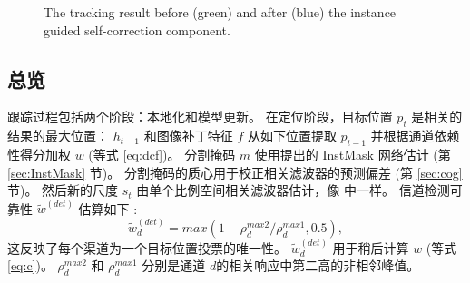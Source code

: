 \begin{figure}
                       \hspace{-0.6em}
                       \hspace{-0.6em}
    \caption{The tracking result before (green) and after (blue) the instance guided self-correction component.}
    \label{fig:IGSC}
\end{figure}

\subsection{总览}
跟踪过程包括两个阶段：本地化和模型更新。
在定位阶段，目标位置 $p_t$ 是相关的结果的最大位置： $h_{t-1}$ 和图像补丁特征 $f$ 从如下位置提取 $p_{t-1}$ 并根据通道依赖性得分加权 $w$ (等式 \ref{eq:dcf})。
分割掩码 $m$ 使用提出的 InstMask 网络估计 (第 \ref{sec:InstMask} 节)。
分割掩码的质心用于校正相关滤波器的预测偏差 (第 \ref{sec:cog} 节)。
然后新的尺度 $s_t$ 由单个比例空间相关滤波器估计，像 \cite{Danelljan2014AccurateSE} 中一样。
信道检测可靠性 $\tilde{w}^{(det)}$ 估算如下 \cite{Lukezic2017DiscriminativeCF}:
\begin{equation} \label{eq:det}
\tilde w_d^{(det)} = max(1 - \rho_d^{max2} / \rho_d^{max1}, 0.5),
\end{equation}
这反映了每个渠道为一个目标位置投票的唯一性。 $\tilde w_d^{(det)}$ 用于稍后计算 $w$ (等式 \ref{eq:c})。 $\rho_d^{max2}$ 和 $\rho_d^{max1}$ 分别是通道 $d$的相关响应中第二高的非相邻峰值。

